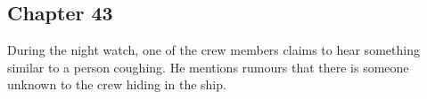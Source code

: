 \subsection{Chapter 43}

During the night watch, one of the crew members claims to hear something
similar to a person coughing. He mentions rumours that there is someone unknown
to the crew hiding in the ship.

